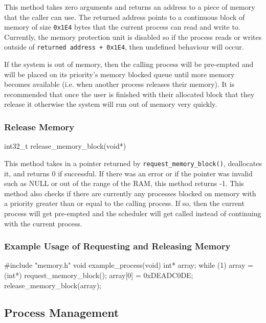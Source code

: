 \documentclass[se]{uw-wkrpt}
\begin{document}
This method takes zero arguments and returns an address to a piece of memory that the caller can use. The returned address points to a continuous block of memory of size \texttt{0x1E4} bytes that the current process can read and write to. Currently, the memory protection unit is disabled so if the process reads or writes outside of \texttt{returned address + 0x1E4}, then undefined behaviour will occur.

If the system is out of memory, then the calling process will be pre-empted and will be placed on its priority's memory blocked queue until more memory becomes available (i.e. when another process releases their memory). It is recommended that once the user is finished with their allocated block that they release it otherwise the system will run out of memory very quickly.

\subsubsection{Release Memory}
\label{sec:release-memory-block}
\begin{code}
int32_t release_memory_block(void*)
\end{code}

This method takes in a pointer returned by \texttt{request\_memory\_block()}, deallocates it, and returns 0 if successful. If there was an error or if the pointer was invalid such as NULL or out of the range of the RAM, this method returns -1. This method also checks if there are currently any processes blocked on memory with a priority greater than or equal to the calling process. If so, then the current process will get pre-empted and the scheduler will get called instead of continuing with the current process.

\subsubsection{Example Usage of Requesting and Releasing Memory}
\begin{code}
#include "memory.h"
void example_process(void) {
    int* array;
    while (1) {
        array = (int*) request_memory_block();
        array[0] = 0xDEADC0DE;
        release_memory_block(array);
    }
}
\end{code}

\subsection{Process Management}
\end{document}
